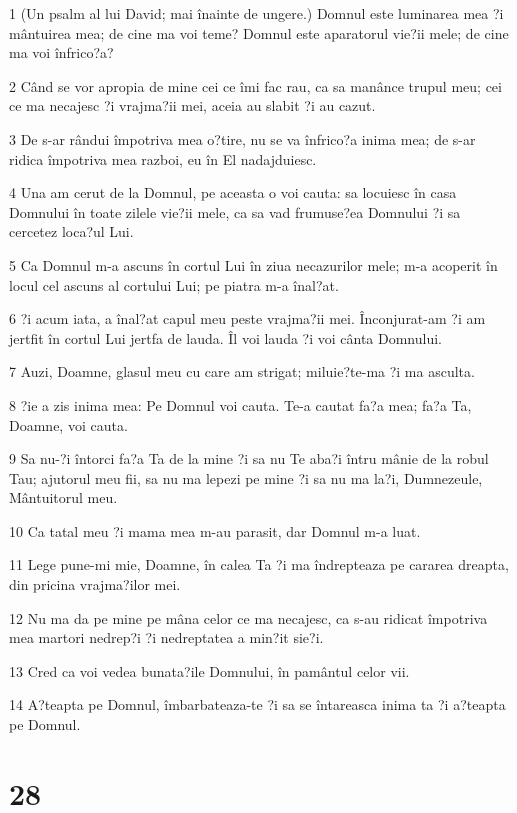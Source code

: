 \par 1 (Un psalm al lui David; mai înainte de ungere.) Domnul este luminarea mea ?i mântuirea mea; de cine ma voi teme? Domnul este aparatorul vie?ii mele; de cine ma voi înfrico?a?
\par 2 Când se vor apropia de mine cei ce îmi fac rau, ca sa manânce trupul meu; cei ce ma necajesc ?i vrajma?ii mei, aceia au slabit ?i au cazut.
\par 3 De s-ar rândui împotriva mea o?tire, nu se va înfrico?a inima mea; de s-ar ridica împotriva mea razboi, eu în El nadajduiesc.
\par 4 Una am cerut de la Domnul, pe aceasta o voi cauta: sa locuiesc în casa Domnului în toate zilele vie?ii mele, ca sa vad frumuse?ea Domnului ?i sa cercetez loca?ul Lui.
\par 5 Ca Domnul m-a ascuns în cortul Lui în ziua necazurilor mele; m-a acoperit în locul cel ascuns al cortului Lui; pe piatra m-a înal?at.
\par 6 ?i acum iata, a înal?at capul meu peste vrajma?ii mei. Înconjurat-am ?i am jertfit în cortul Lui jertfa de lauda. Îl voi lauda ?i voi cânta Domnului.
\par 7 Auzi, Doamne, glasul meu cu care am strigat; miluie?te-ma ?i ma asculta.
\par 8 ?ie a zis inima mea: Pe Domnul voi cauta. Te-a cautat fa?a mea; fa?a Ta, Doamne, voi cauta.
\par 9 Sa nu-?i întorci fa?a Ta de la mine ?i sa nu Te aba?i întru mânie de la robul Tau; ajutorul meu fii, sa nu ma lepezi pe mine ?i sa nu ma la?i, Dumnezeule, Mântuitorul meu.
\par 10 Ca tatal meu ?i mama mea m-au parasit, dar Domnul m-a luat.
\par 11 Lege pune-mi mie, Doamne, în calea Ta ?i ma îndrepteaza pe cararea dreapta, din pricina vrajma?ilor mei.
\par 12 Nu ma da pe mine pe mâna celor ce ma necajesc, ca s-au ridicat împotriva mea martori nedrep?i ?i nedreptatea a min?it sie?i.
\par 13 Cred ca voi vedea bunata?ile Domnului, în pamântul celor vii.
\par 14 A?teapta pe Domnul, îmbarbateaza-te ?i sa se întareasca inima ta ?i a?teapta pe Domnul.

\chapter{28}

